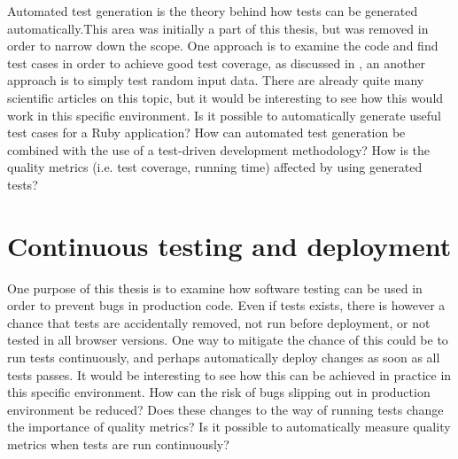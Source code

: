 Automated test generation is the theory behind how tests can be
generated automatically.This area was initially a part of this thesis,
but was removed in order to narrow down the scope. One approach is to
examine the code and find test cases in order to achieve good test
coverage, as discussed in , an another
approach is to simply test random input data. There are already quite
many scientific articles on this topic, but it would be interesting to
see how this would work in this specific environment. Is it possible to
automatically generate useful test cases for a Ruby application? How can
automated test generation be combined with the use of a test-driven
development methodology? How is the quality metrics (i.e. test coverage,
running time) affected by using generated tests?\\


\section{Continuous testing and deployment}

One purpose of this thesis is to examine how software testing can be
used in order to prevent bugs in production code. Even if tests exists,
there is however a chance that tests are accidentally removed, not run
before deployment, or not tested in all browser versions. One way to
mitigate the chance of this could be to run tests continuously, and
perhaps automatically deploy changes as soon as all tests passes. It
would be interesting to see how this can be achieved in practice in this
specific environment. How can the risk of bugs slipping out in
production environment be reduced? Does these changes to the way of
running tests change the importance of quality metrics? Is it possible
to automatically measure quality metrics when tests are run
continuously?\\

